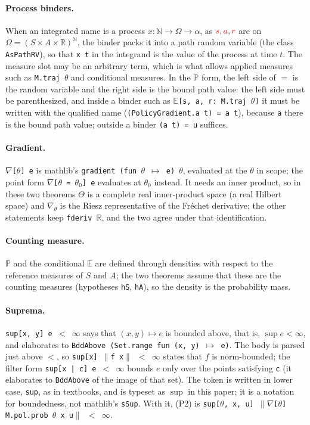 \documentclass[11pt,a4paper]{article}
\newcommand{\R}{\mathbb{R}}
\newcommand{\N}{\mathbb{N}}
\newcommand{\E}{\mathbb{E}}
\newcommand{\Prb}{\mathbb{P}}
\newcommand{\rv}[1]{{\color{red}#1}}       %
\newcommand{\sv}{\rv{s}}
\newcommand{\av}{\rv{a}}
\newcommand{\rw}{\rv{r}}
\begin{document}
\paragraph{Process binders.}
When an integrated name is a process $x:\N\to\Omega\to\alpha$, as $\sv,\av,\rw$ are on $\Omega=(S\times A\times\R)^{\N}$, the binder packs it into a path random variable (the class \texttt{AsPathRV}), so that \texttt{x t} in the integrand is the value of the process at time $t$.
The measure slot may be an arbitrary term, which is what allows applied measures such as \texttt{M.traj $\theta$} and conditional measures.
In the $\Prb$ form, the left side of $=$ is the random variable and the right side is the bound path value: the left side must be parenthesized, and inside a binder such as \texttt{$\mathbb{E}$[s, a, r: M.traj $\theta$]} it must be written with the qualified name (\texttt{(PolicyGradient.a t) = a t}), because \texttt{a} there is the bound path value; outside a binder \texttt{(a t) = u} suffices.

\paragraph{Gradient.}
\texttt{$\nabla$[$\theta$] e} is mathlib's \texttt{gradient (fun $\theta$ $\mapsto$ e) $\theta$}, evaluated at the $\theta$ in scope; the point form \texttt{$\nabla$[$\theta$ = $\theta_0$] e} evaluates at $\theta_0$ instead.
It needs an inner product, so in these two theorems $\Theta$ is a complete real inner-product space (a real Hilbert space) and $\nabla_\theta$ is the Riesz representative of the Fr\'echet derivative; the other statements keep \texttt{fderiv $\R$}, and the two agree under that identification.

\paragraph{Counting measure.}
$\Prb$ and the conditional $\E$ are defined through densities with respect to the reference measures of $S$ and $A$; the two theorems assume that these are the counting measures (hypotheses \texttt{hS}, \texttt{hA}), so the density is the probability mass.

\paragraph{Suprema.}
\texttt{sup[x, y] e $<$ $\infty$} says that $(x,y)\mapsto e$ is bounded above, that is, $\sup e<\infty$, and elaborates to \texttt{BddAbove (Set.range fun (x, y) $\mapsto$ e)}.
The body is parsed just above $<$, so \texttt{sup[x] $\|$f x$\|$ $<$ $\infty$} states that $f$ is norm-bounded; the filter form \texttt{sup[x | c] e $<$ $\infty$} bounds $e$ only over the points satisfying \texttt{c} (it elaborates to \texttt{BddAbove} of the image of that set).
The token is written in lower case, \texttt{sup}, as in textbooks, and is typeset as $\sup$ in this paper; it is a notation for boundedness, not mathlib's \texttt{sSup}.
With it, (P2) is \texttt{sup[$\theta$, x, u] $\|\nabla$[$\theta$] M.pol.prob $\theta$ x u$\|$ $<$ $\infty$}.
\end{document}
